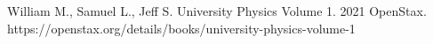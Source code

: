 \documentclass[11pt]{amsart}
\begin{document}
\FloatBarrier %
\newpage


\begin{thebibliography}{99}
 William M., Samuel L., Jeff S. University Physics Volume 1. 2021 OpenStax. https://openstax.org/details/books/university-physics-volume-1 

\end{thebibliography}
\end{document}
